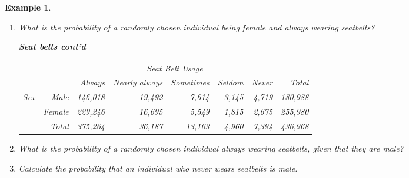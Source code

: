 \documentclass[12pt]{amsart}
\newtheorem{example}[theorem]{Example}
\begin{document}
{\begin{example}
\begin{enumerate}
same as previous
\vspace{3cm}

\item What is the probability of a randomly chosen individual being female and always wearing seatbelts? 


\vspace{3cm}







\newpage
\textbf{Seat belts cont'd} \newline

\vspace{.2cm}
\begin{center}
		\begin{tabular}{rrrrrrrr}
			& &  \multicolumn{5}{c}{\textit{Seat Belt Usage}} &  \\ 
			\cline{3-7}
			&       & Always & Nearly always & Sometimes    & Seldom     & Never  & Total \\ 
			\cline{2-8}
			\textit{Sex}    & Male    & 146,018   & 19,492    & 7,614   &  3,145  & 4,719 & 180,988 \\ 
			& Female   & 229,246    & 16,695    & 5,549    & 1,815  & 2,675 &  255,980 \\ 
			\cline{2-8}
			& Total & 375,264    & 36,187    & 13,163    & 4,960   & 7,394  &  436,968
		\end{tabular}
\end{center}
\vspace{.2cm}



\item What is the probability of a randomly chosen individual always wearing seatbelts, given that they are male?

\vspace{3cm}

\item Calculate the probability that an individual who never wears seatbelts is male.


\end{enumerate}
\end{example}}
\end{document}
